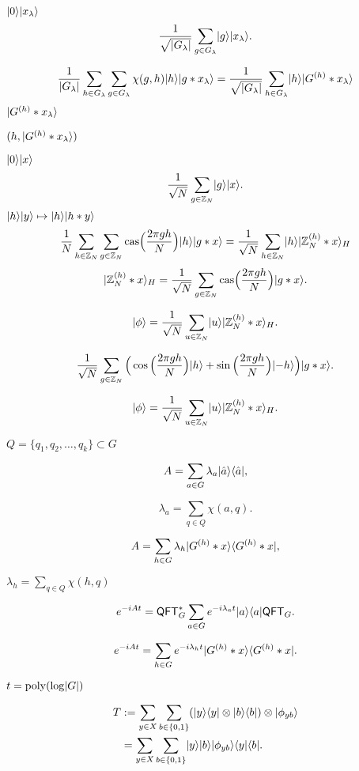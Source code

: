 \documentclass[11pt]{article}
\theoremstyle{definition}
\newcommand{\cas}{\mathrm{cas}}
\newcommand{\qft}{\mathsf{QFT}}
\begin{document}
$\lvert0\rangle\lvert x_\lambda\rangle$
\[ \frac{1}{\sqrt{\lvert G_\lambda\rvert}} \sum_{g \in G_\lambda} \lvert g\rangle\lvert x_\lambda\rangle. \]

\[ \frac{1}{\lvert G_\lambda\rvert} \sum_{h \in G_\lambda} \sum_{g \in G_\lambda} \chi(g, h) \lvert h\rangle\lvert g * x_\lambda\rangle = \frac{1}{\sqrt{\lvert G_\lambda\rvert}} \sum_{h \in G_\lambda} \lvert h\rangle \lvert G^{(h)} * x_\lambda\rangle \]
$\lvert G^{(h)} * x_\lambda\rangle$

$(h, \lvert G^{(h)} * x_\lambda\rangle)$


$\lvert0\rangle\lvert x\rangle$
\[ \frac{1}{\sqrt{N}} \sum_{g \in \mathbb{Z}_N} \lvert g\rangle\lvert x\rangle. \]
$\lvert h\rangle\lvert y\rangle \mapsto \lvert h\rangle\lvert h * y\rangle$
\[ \frac{1}{N} \sum_{h \in \Z_N} \sum_{g \in \Z_N} \cas\Big(\frac{2\pi gh}{N}\Big) \ket{h}\ket{g * x} = \frac{1}{\sqrt{N}} \sum_{h \in \Z_N} \ket{h} \ket{\Z_N^{(h)} * x}_H \]
\[ \ket{\Z_N^{(h)} * x}_H = \frac{1}{\sqrt{N}} \sum_{g \in \Z_N} \cas\Big(\frac{2\pi gh}{N}\Big) \ket{g * x}. \]

\[ \lvert\phi\rangle = \frac{1}{\sqrt{N}} \sum_{u \in \mathbb{Z}_N} \lvert u\rangle \lvert\mathbb{Z}_N^{(h)} * x\rangle_H. \]

\[ \frac{1}{\sqrt{N}} \sum_{g \in \mathbb{Z}_N} \Big( \cos\Big( \frac{2\pi gh}{N} \Big) \lvert h\rangle + \sin\Big( \frac{2\pi gh}{N} \Big) \lvert-h\rangle \Big) \lvert g * x\rangle. \]

\[ \lvert\phi\rangle = \frac{1}{\sqrt{N}} \sum_{u \in \mathbb{Z}_N} \lvert u\rangle \lvert\mathbb{Z}_N^{(h)} * x\rangle_H. \]

$Q = \{q_1, q_2, \dots, q_k\} \subset G$

\[ A = \sum_{a \in G} \lambda_a \lvert\hat{a}\rangle \langle\hat{a}\rvert, \]

\[ \lambda_a = \sum_{q \in Q} \chi(a, q). \]


\[ A = \sum_{h \in G} \lambda_h \lvert G^{(h)} * x\rangle \langle G^{(h)} * x\rvert, \]


$\lambda_h = \sum_{q \in Q} \chi(h, q)$

\begin{equation}
    \label{eq:adjmat-fb}
    e^{-iAt} = \qft_G^* \sum_{a \in G} e^{-i\lambda_a t} \ket{a} \bra{a} \qft_G.
\end{equation}


\[ e^{-iAt} = \sum_{h \in G} e^{-i\lambda_h t} \lvert G^{(h)} * x\rangle \langle G^{(h)} * x\rvert. \]

$t = \operatorname{poly}(\log\lvert G\rvert)$



\begin{align*}
    T
    & := \sum_{y \in X} \sum_{b \in \{0, 1\}} (\lvert y\rangle\langle y\rvert \otimes \lvert b\rangle\langle b\rvert) \otimes \lvert\phi_{yb}\rangle \\
    & = \sum_{y \in X} \sum_{b \in \{0, 1\}} \lvert y\rangle \lvert b\rangle \lvert\phi_{yb}\rangle \langle y\rvert \langle b\rvert.
\end{align*}
\end{document}
